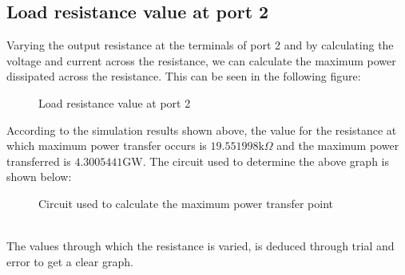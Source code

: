 \documentclass[titlepage]{article}
\begin{document}
\subsection{Load resistance value at port 2}
Varying the output resistance at the terminals of port 2 and by calculating the voltage and current across the resistance, we can calculate the maximum power dissipated across the resistance.
This can be seen in the following figure:
\begin{center}
    \begin{figure}[ht]
        \centering
        \caption{Load resistance value at port 2}
    \end{figure}
\end{center}
According to the simulation results shown above, the value for the resistance at which maximum power transfer occurs is $19.551998\mathrm{k}\Omega$ and the maximum power transferred is $4.3005441$GW.
The circuit used to determine the above graph is shown below:
\begin{figure}[ht]
    \centering
    \caption{Circuit used to calculate the maximum power transfer point}
\end{figure}\\
The values through which the resistance is varied, is deduced through trial and error to get a clear graph.
\end{document}

